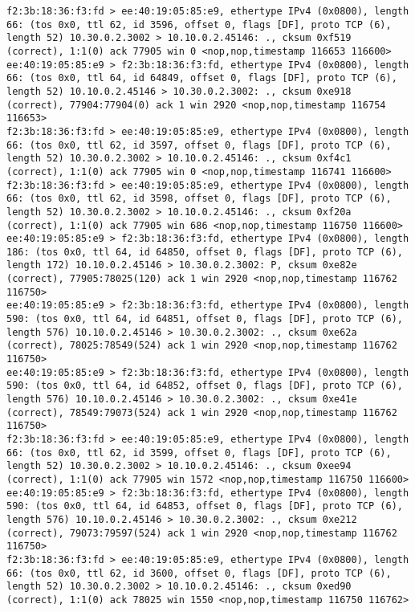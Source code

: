 \documentclass[a4paper,12pt]{article}
\begin{document}
\begin{Verbatim}
f2:3b:18:36:f3:fd > ee:40:19:05:85:e9, ethertype IPv4 (0x0800), length 66: (tos 0x0, ttl 62, id 3596, offset 0, flags [DF], proto TCP (6), length 52) 10.30.0.2.3002 > 10.10.0.2.45146: ., cksum 0xf519 (correct), 1:1(0) ack 77905 win 0 <nop,nop,timestamp 116653 116600>
ee:40:19:05:85:e9 > f2:3b:18:36:f3:fd, ethertype IPv4 (0x0800), length 66: (tos 0x0, ttl 64, id 64849, offset 0, flags [DF], proto TCP (6), length 52) 10.10.0.2.45146 > 10.30.0.2.3002: ., cksum 0xe918 (correct), 77904:77904(0) ack 1 win 2920 <nop,nop,timestamp 116754 116653>
f2:3b:18:36:f3:fd > ee:40:19:05:85:e9, ethertype IPv4 (0x0800), length 66: (tos 0x0, ttl 62, id 3597, offset 0, flags [DF], proto TCP (6), length 52) 10.30.0.2.3002 > 10.10.0.2.45146: ., cksum 0xf4c1 (correct), 1:1(0) ack 77905 win 0 <nop,nop,timestamp 116741 116600>
f2:3b:18:36:f3:fd > ee:40:19:05:85:e9, ethertype IPv4 (0x0800), length 66: (tos 0x0, ttl 62, id 3598, offset 0, flags [DF], proto TCP (6), length 52) 10.30.0.2.3002 > 10.10.0.2.45146: ., cksum 0xf20a (correct), 1:1(0) ack 77905 win 686 <nop,nop,timestamp 116750 116600>
ee:40:19:05:85:e9 > f2:3b:18:36:f3:fd, ethertype IPv4 (0x0800), length 186: (tos 0x0, ttl 64, id 64850, offset 0, flags [DF], proto TCP (6), length 172) 10.10.0.2.45146 > 10.30.0.2.3002: P, cksum 0xe82e (correct), 77905:78025(120) ack 1 win 2920 <nop,nop,timestamp 116762 116750>
ee:40:19:05:85:e9 > f2:3b:18:36:f3:fd, ethertype IPv4 (0x0800), length 590: (tos 0x0, ttl 64, id 64851, offset 0, flags [DF], proto TCP (6), length 576) 10.10.0.2.45146 > 10.30.0.2.3002: ., cksum 0xe62a (correct), 78025:78549(524) ack 1 win 2920 <nop,nop,timestamp 116762 116750>
ee:40:19:05:85:e9 > f2:3b:18:36:f3:fd, ethertype IPv4 (0x0800), length 590: (tos 0x0, ttl 64, id 64852, offset 0, flags [DF], proto TCP (6), length 576) 10.10.0.2.45146 > 10.30.0.2.3002: ., cksum 0xe41e (correct), 78549:79073(524) ack 1 win 2920 <nop,nop,timestamp 116762 116750>
f2:3b:18:36:f3:fd > ee:40:19:05:85:e9, ethertype IPv4 (0x0800), length 66: (tos 0x0, ttl 62, id 3599, offset 0, flags [DF], proto TCP (6), length 52) 10.30.0.2.3002 > 10.10.0.2.45146: ., cksum 0xee94 (correct), 1:1(0) ack 77905 win 1572 <nop,nop,timestamp 116750 116600>
ee:40:19:05:85:e9 > f2:3b:18:36:f3:fd, ethertype IPv4 (0x0800), length 590: (tos 0x0, ttl 64, id 64853, offset 0, flags [DF], proto TCP (6), length 576) 10.10.0.2.45146 > 10.30.0.2.3002: ., cksum 0xe212 (correct), 79073:79597(524) ack 1 win 2920 <nop,nop,timestamp 116762 116750>
f2:3b:18:36:f3:fd > ee:40:19:05:85:e9, ethertype IPv4 (0x0800), length 66: (tos 0x0, ttl 62, id 3600, offset 0, flags [DF], proto TCP (6), length 52) 10.30.0.2.3002 > 10.10.0.2.45146: ., cksum 0xed90 (correct), 1:1(0) ack 78025 win 1550 <nop,nop,timestamp 116750 116762>

\end{Verbatim}
\end{document}
